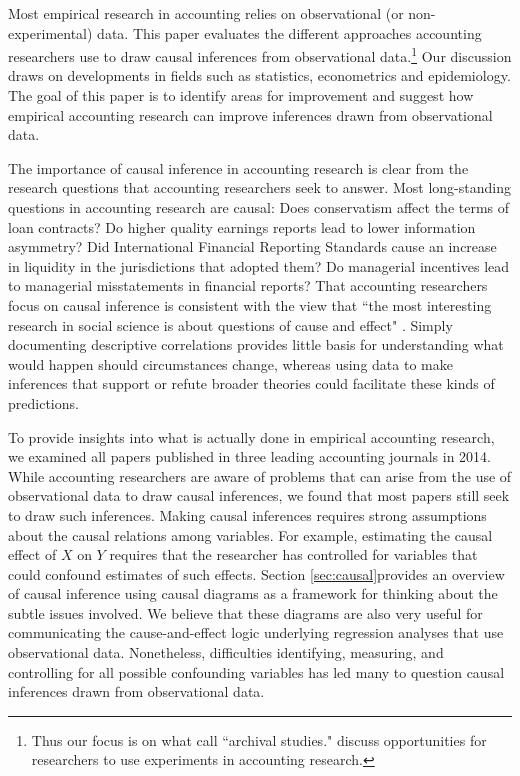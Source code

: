 \documentclass[12pt,reqno,titlepage]{amsart}
\theoremstyle{definition}
\begin{document}
\begin{doublespace} 
Most empirical research in accounting relies on observational (or non-experimental) data.
This paper evaluates the different approaches accounting researchers use to draw causal inferences from observational data.\footnote{Thus our focus is on what \citet{Bloomfield:2015aa} call ``archival studies." 
\cite{Floyd:2015aa} discuss opportunities for researchers to use experiments in accounting research.} 
Our discussion draws on developments in fields such as statistics, econometrics and epidemiology. 
The goal of this paper is to identify areas for improvement and suggest how empirical accounting research can improve inferences drawn from observational data.

The importance of causal inference in accounting research is clear from the research questions that accounting researchers seek to answer. 
Most long-standing questions in accounting research are causal: 
Does conservatism affect the terms of loan contracts?
Do higher quality earnings reports lead to lower information asymmetry? 
Did International Financial Reporting Standards cause an increase in liquidity in the jurisdictions that adopted them?
Do managerial incentives lead to managerial misstatements in financial reports?
That accounting researchers focus on causal inference is consistent with the view that ``the most interesting research in social science is about questions of cause and effect" \cite[p.\,3]{Angrist:2008vk}.
Simply documenting descriptive correlations provides little basis for understanding what would happen should circumstances change, 
whereas using data to make inferences that support or refute broader theories could facilitate these kinds of predictions.


To provide insights into what is actually done in empirical accounting research, we examined all papers published in three leading accounting journals in 2014. 
While accounting researchers are aware of problems that can arise from the use of observational data to draw causal inferences, we found that most papers still seek to draw such inferences. 
Making causal inferences requires strong assumptions about the causal relations among variables.
For example, estimating the causal effect of $X$ on $Y$ requires that the researcher has controlled for variables that could confound estimates of such effects.
Section \ref{sec:causal}provides an overview of causal inference using causal diagrams as a framework for thinking about the subtle issues involved.
We believe that these diagrams are also very useful for communicating the cause-and-effect logic underlying regression analyses that use observational data.
Nonetheless, difficulties identifying, measuring, and controlling for all possible confounding variables has led many to question causal inferences drawn from observational data.


\end{doublespace}
\end{document}
